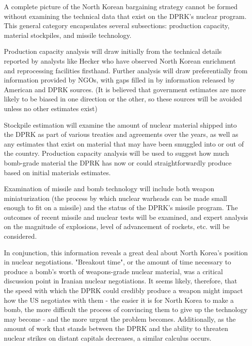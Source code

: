 \documentclass{article}
\begin{document}
A complete picture of the North Korean bargaining strategy cannot be formed without examining the technical data that exist on the DPRK's nuclear program. This general category encapsulates several subsections: production capacity, material stockpiles, and missile technology.

Production capacity analysis will draw initially from the technical details reported by analysts like Hecker\cite{hecker} who have observed North Korean enrichment and reprocessing facilities firsthand. Further analysis will draw preferentially from information provided by NGOs, with gaps filled in by information released by American and DPRK sources. (It is believed that government estimates are more likely to be biased in one direction or the other, so these sources will be avoided unless no other estimates exist)

Stockpile estimation will examine the amount of nuclear material shipped into the DPRK as part of various treaties and agreements over the years, as well as any estimates that exist on material that may have been smuggled into or out of the country. Production capacity analysis will be used to suggest how much bomb-grade material the DPRK has now or could straightforwardly produce based on initial materials estimates.

Examination of missile and bomb technology will include both weapon miniaturization (the process by which nuclear warheads can be made small enough to fit on a missile) and the status of the DPRK's missile program. The outcomes of recent missile and nuclear tests will be examined, and expert analysis on the magnitude of explosions, level of advancement of rockets, etc. will be considered. 

In conjunction, this information reveals a great deal about North Korea's position in nuclear negotiations. "Breakout time", or the amount of time necessary to produce a bomb's worth of weapons-grade nuclear material, was a critical discussion point in Iranian nuclear negotiations. It seems likely, therefore, that the speed with which the DPRK could credibly produce a weapon might impact how the US negotiates with them - the easier it is for North Korea to make a bomb, the more difficult the process of convincing them to give up the technology may become - and the more urgent the problem becomes. Additionally, as the amount of work that stands between the DPRK and the ability to threaten nuclear strikes on distant capitals decreases, a similar calculus occurs.

\end{document}
